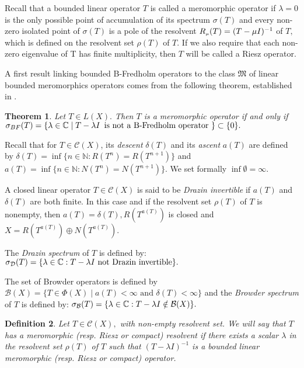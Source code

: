 \documentclass[11pt]{article}
\numberwithin{equation}{section} \allowdisplaybreaks
\newtheorem{theorem}{\sc Theorem}[section]
\newtheorem{definition}[theorem]{\sc Definition}
\newcommand{\bet}{\begin{theorem}}
\newcommand{\eet}{\end{theorem}}
\newcommand{\bdf}{\begin{definition}\rm}
\newcommand{\edf}{\end{definition}}
\newcommand{\ch}{{ \mathcal C}(X)}
\begin{document}
Recall \cite{CA-1} that a bounded linear  operator $T$  is called
a meromorphic operator if $ \lambda = 0$ is the only possible
point of accumulation of its spectrum $\sigma(T)$ and every
non-zero isolated point of $\sigma(T)$ is a pole of the resolvent
$R_\texttt{{\tiny $\mu $}}(T)= (T-\mu I)^{-1}$  of $T,$ which is
defined on the resolvent set $\rho(T)$ of $T.$  If we also require
that each non-zero eigenvalue of T has finite multiplicity, then
$T$ will be called a Riesz operator.


A first result linking bounded B-Fredholm operators to the class $
\mathfrak{M}$ of linear bounded meromorphics operators comes from
the following theorem, established in \cite[Theorem 2.11]{P13}.

\bet \label{thm1.1} Let $ T \in L(X).$  Then    $T$ is a
meromorphic operator if and
 only if  $ \sigma_{BF} (T)= \{ \lambda \in \mathbb{C} \mid  T - \lambda I \text {\,
 is not a B-Fredholm operator } \} \subset \{0\}.$
\eet

Recall that for $T\in \ch$,  its  {\it descent} $\delta(T)$ and
its  {\it ascent} $ a(T) $  are defined by
 $ \delta(T)=\inf  \{n\in \mathbb{N}: R(T^n) = R(T^{n+1})\}$
and
 $ a(T)= \inf \{n\in \mathbb{N} : N(T^{n})=N(T^{n+1})\}$. We set formally $\inf\emptyset =\infty$.

A closed linear operator $T\in \ch$ is said to be {\it Drazin
invertible} if $a(T)$ and $ \delta(T)$ are both finite.  In this
case and  if the resolvent set $\rho(T)$ of $T$  is nonempty, then
$a(T)= \delta(T),  R(T^{a(T)})$ is closed and $ X= R(T^{a(T)})
\oplus  N(T^{a(T)}).$



The {\it Drazin spectrum} of $T$ is defined by: $ \sigma_{\cal
D}(T)= \{\lambda\in\mathbb{C}: T-\lambda
   I \text{ not Drazin invertible} \}.$


The set  of  Browder operators is defined by $\mathcal{B}(X)=\{ T
\in \Phi (X) \mid  a (T)<\infty \,\, \text {and} \,\,\delta(T) <
\infty \}$ and
  the {\it  Browder spectrum} of $T$ is defined by: $ \sigma_{{\cal B}}(T)= \{\lambda\in\mathbb{C}:T-\lambda
   I\notin \mathcal{B}(X)\}.$












\bdf \label{def6}  Let $T \in \ch, $  with non-empty resolvent
set. We will say that $T$ has
 a meromorphic (resp. Riesz or  compact) resolvent if there exists a
scalar $\lambda $ in the resolvent set $ \rho(T)$  of  $T$  such
that $ (T-\lambda I)^{-1}$ is a bounded linear  meromorphic (resp.
Riesz or compact) operator. \edf
\end{document}
